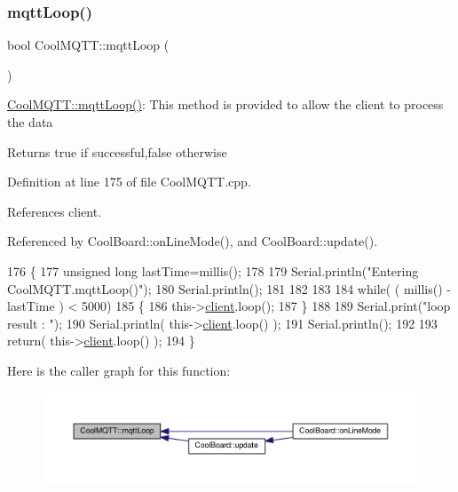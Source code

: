 \subsubsection{\texorpdfstring{mqtt\+Loop()}{mqttLoop()}}
{\footnotesize\ttfamily bool Cool\+M\+Q\+T\+T\+::mqtt\+Loop (\begin{DoxyParamCaption}{ }\end{DoxyParamCaption})}

\hyperlink{classCoolMQTT_aa5eaae967b562b62cbcf2b8d81f6e5d5}{Cool\+M\+Q\+T\+T\+::mqtt\+Loop()}\+: This method is provided to allow the client to process the data

\begin{DoxyReturn}{Returns}
true if successful,false otherwise 
\end{DoxyReturn}


Definition at line 175 of file Cool\+M\+Q\+T\+T.\+cpp.



References client.



Referenced by Cool\+Board\+::on\+Line\+Mode(), and Cool\+Board\+::update().


\begin{DoxyCode}
176 \{
177     \textcolor{keywordtype}{unsigned} \textcolor{keywordtype}{long} lastTime=millis();
178 
179     Serial.println(\textcolor{stringliteral}{"Entering CoolMQTT.mqttLoop()"});
180     Serial.println();
181 
182     
183 
184     \textcolor{keywordflow}{while}( ( millis() - lastTime ) < 5000)
185     \{
186         this->\hyperlink{classCoolMQTT_a4ca71e4f76ef868692a297efd45b1415}{client}.loop();  
187     \}
188     
189     Serial.print(\textcolor{stringliteral}{"loop result : "});
190     Serial.println( this->\hyperlink{classCoolMQTT_a4ca71e4f76ef868692a297efd45b1415}{client}.loop() );
191     Serial.println();
192 
193     \textcolor{keywordflow}{return}( this->\hyperlink{classCoolMQTT_a4ca71e4f76ef868692a297efd45b1415}{client}.loop() );
194 \}
\end{DoxyCode}
Here is the caller graph for this function\+:
\nopagebreak
\begin{figure}[H]
\begin{center}
\leavevmode
\includegraphics[width=350pt]{classCoolMQTT_aa5eaae967b562b62cbcf2b8d81f6e5d5_icgraph}
\end{center}
\end{figure}
\mbox{\label{classCoolMQTT_a40553a0ad4b5ecf1cb4411ab54ca85fb}} 
